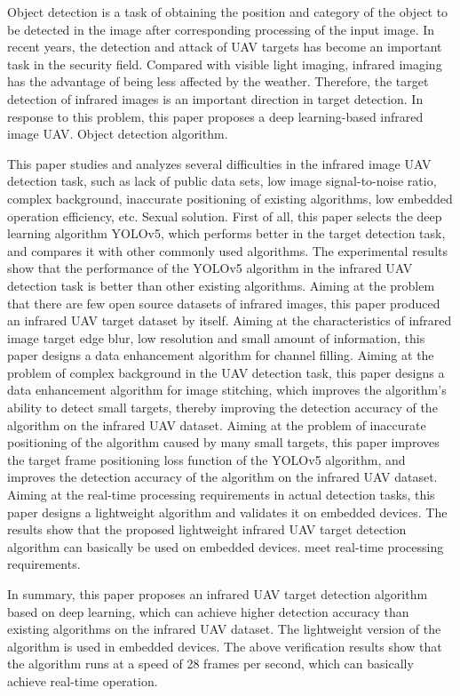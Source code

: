\begin{eabstract}
  Object detection is a task of obtaining the position and category of the object to be detected in the image after corresponding processing of the input image. In recent years, the detection and attack of UAV targets has become an important task in the security field. Compared with visible light imaging, infrared imaging has the advantage of being less affected by the weather. Therefore, the target detection of infrared images is an important direction in target detection. In response to this problem, this paper proposes a deep learning-based infrared image UAV. Object detection algorithm.

This paper studies and analyzes several difficulties in the infrared image UAV detection task, such as lack of public data sets, low image signal-to-noise ratio, complex background, inaccurate positioning of existing algorithms, low embedded operation efficiency, etc. Sexual solution. First of all, this paper selects the deep learning algorithm YOLOv5, which performs better in the target detection task, and compares it with other commonly used algorithms. The experimental results show that the performance of the YOLOv5 algorithm in the infrared UAV detection task is better than other existing algorithms. Aiming at the problem that there are few open source datasets of infrared images, this paper produced an infrared UAV target dataset by itself. Aiming at the characteristics of infrared image target edge blur, low resolution and small amount of information, this paper designs a data enhancement algorithm for channel filling. Aiming at the problem of complex background in the UAV detection task, this paper designs a data enhancement algorithm for image stitching, which improves the algorithm's ability to detect small targets, thereby improving the detection accuracy of the algorithm on the infrared UAV dataset. Aiming at the problem of inaccurate positioning of the algorithm caused by many small targets, this paper improves the target frame positioning loss function of the YOLOv5 algorithm, and improves the detection accuracy of the algorithm on the infrared UAV dataset. Aiming at the real-time processing requirements in actual detection tasks, this paper designs a lightweight algorithm and validates it on embedded devices. The results show that the proposed lightweight infrared UAV target detection algorithm can basically be used on embedded devices. meet real-time processing requirements.

In summary, this paper proposes an infrared UAV target detection algorithm based on deep learning, which can achieve higher detection accuracy than existing algorithms on the infrared UAV dataset. The lightweight version of the algorithm is used in embedded devices. The above verification results show that the algorithm runs at a speed of 28 frames per second, which can basically achieve real-time operation.
\end{eabstract}
